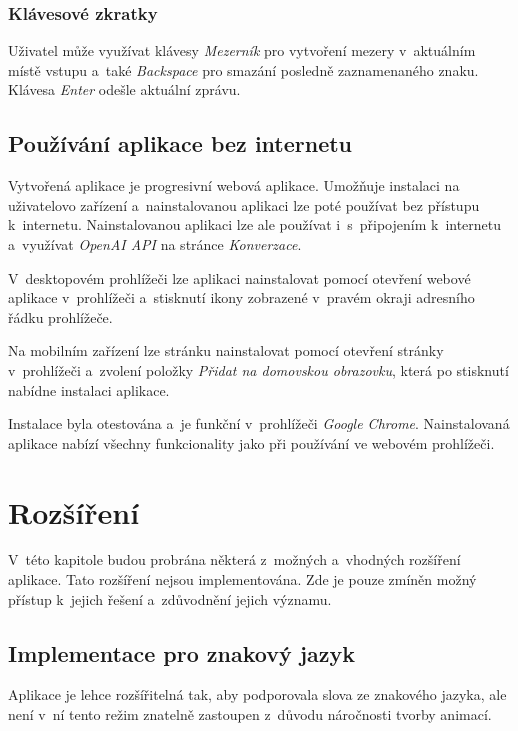 \documentclass[
  master,
  program=ainfvs,
  biblatex,
  figures=true,
  tables=false,
  sourcecodes=true,
  glossaries,
  index
]{kidiplom}
\begin{document}
        \subsubsection{Klávesové zkratky}
            Uživatel může využívat klávesy \emph{Mezerník} pro vytvoření mezery v~aktuálním místě vstupu a~také \emph{Backspace} pro smazání posledně zaznamenaného znaku. Klávesa \emph{Enter} odešle aktuální zprávu.

    \subsection{Používání aplikace bez internetu}
        Vytvořená aplikace je progresivní webová aplikace. Umožňuje instalaci na uživatelovo zařízení a~nainstalovanou aplikaci lze poté používat bez přístupu k~internetu. Nainstalovanou aplikaci lze ale používat i~s~připojením k~internetu a~využívat \emph{OpenAI API} na stránce \emph{Konverzace}.
        
        V~desktopovém prohlížeči lze aplikaci nainstalovat pomocí otevření webové aplikace v~prohlížeči a~stisknutí ikony zobrazené v~pravém okraji adresního řádku prohlížeče.

        Na mobilním zařízení lze stránku nainstalovat pomocí otevření stránky v~prohlížeči a~zvolení položky \emph{Přidat na domovskou obrazovku}, která po stisknutí nabídne instalaci aplikace.

        Instalace byla otestována a~je funkční v~prohlížeči \emph{Google Chrome}. Nainstalovaná aplikace nabízí všechny funkcionality jako při používání ve webovém prohlížeči.

\clearpage



\section{Rozšíření}
    V~této kapitole budou probrána některá z~možných a~vhodných rozšíření aplikace. Tato rozšíření nejsou implementována. Zde je pouze zmíněn možný přístup k~jejich řešení a~zdůvodnění jejich významu.


    \subsection{Implementace pro znakový jazyk}
        Aplikace je lehce rozšířitelná tak, aby podporovala slova ze znakového jazyka, ale není v~ní tento režim znatelně zastoupen z~důvodu náročnosti tvorby animací.
            
\end{document}
